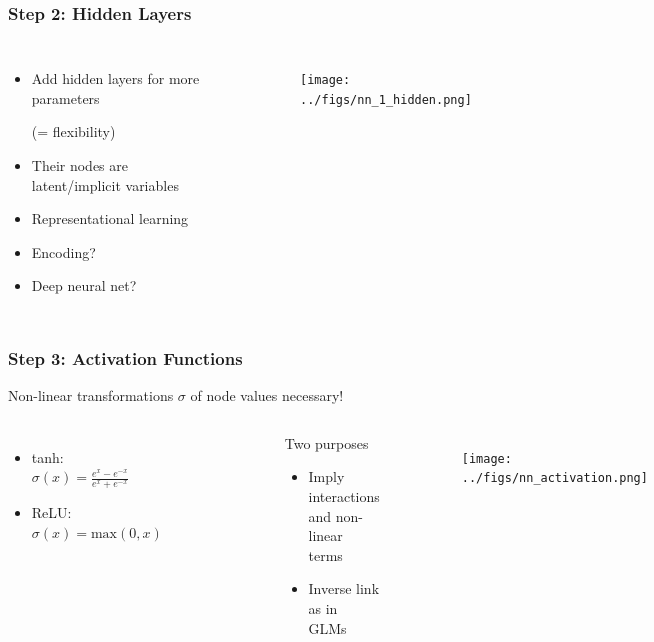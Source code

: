 \documentclass[
    utf8,
    aspectratio=169
]{beamer}  %
\begin{document}
\begin{frame}
	\frametitle{Step 2: Hidden Layers}
	\begin{columns}
		\begin{itemize}
			\item Add \alert{hidden layers} for more parameters 
			
			(= flexibility)
			\item Their nodes are latent/implicit variables
			\item Representational learning
			\item \small{\alert{Encoding}?}
			\item \small{\alert{Deep} neural net?}
		\end{itemize}
		\begin{example}
		\end{example}
		\begin{figure}
			\texttt{[image: ../figs/nn\_1\_hidden.png]}
		\end{figure}
	\end{columns}
\end{frame}

\begin{frame}
	\frametitle{Step 3: Activation Functions}
	Non-linear transformations $\sigma$ of node values necessary!
	\begin{columns}[onlytextwidth]
		\column{0.35\textwidth}
		\begin{itemize}
			\item tanh: $\sigma(x) = \frac{e^x - e^{-x}}{e^x + e^{-x}}$
			\item ReLU: $\sigma(x) = \text{max}(0, x)$
		\end{itemize}
		\begin{figure}
			\includegraphics[width=0.8\textwidth]{pics/activation_functions.png}
		\end{figure}
		\begin{block}{Two purposes}
			\begin{itemize}
				\item Imply interactions and non-linear terms
				\item Inverse link as in GLMs
			\end{itemize}
		\end{block}
		\begin{example}
		\end{example}
		\column{0.65\textwidth}
		\begin{figure}
			\texttt{[image: ../figs/nn\_activation.png]}
		\end{figure}
	\end{columns}
\end{frame}
\end{document}

